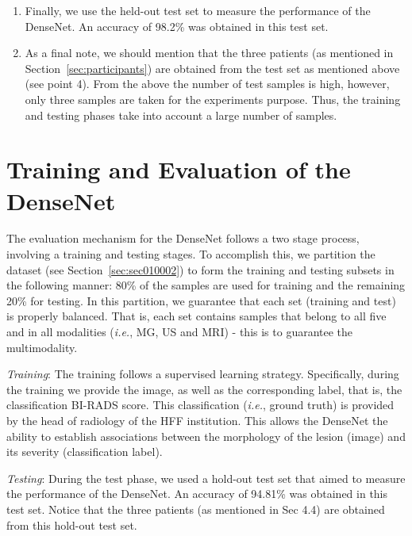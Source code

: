 \begin{enumerate}
\hfill
\item Finally, we use the held-out test set to measure the performance of the DenseNet. An accuracy of 98.2\% was obtained in this test set.
\hfill
\item As a final note, we should mention that the three patients (as mentioned in Section~\ref{sec:participants}) are obtained from the test set as mentioned above (see point 4). 
From the above the number of test samples is high, however, only three samples are taken  for the experiments purpose. Thus, the training and testing phases take into account a large number of samples.
\end{enumerate}

\section{Training and Evaluation of the DenseNet}
\label{sec:app003002}

The evaluation mechanism for the DenseNet follows a two stage process, involving a training and testing stages.
To accomplish this, we partition the dataset (see Section~\ref{sec:sec010002}) to form the training and testing subsets in the following manner:
80\% of the samples are used for training and the remaining 20\% for testing.
In this partition, we guarantee that each set (training and test) is properly balanced.
That is, each set contains samples that belong to all five and in all modalities ({\it i.e.}, MG, US and MRI) - this is to guarantee  the multimodality.

\vspace{1mm}

\noindent
{\it Training}:
The training follows a supervised learning strategy.
Specifically, during the training we provide the image, as well as the corresponding label, that is, the classification BI-RADS score.
This classification ({\it i.e.}, ground truth) is provided by the head of radiology of the HFF institution.
This allows the DenseNet the ability to establish associations between the morphology of the lesion (image) and its severity (classification label).

\vspace{1mm}

\noindent
{\it Testing}:
During the test phase, we used a hold-out test set that aimed to measure  the performance of the DenseNet.
An accuracy of 94.81\% was obtained in this test set. 
Notice that the three patients (as mentioned in Sec 4.4) are obtained from this hold-out test set.

